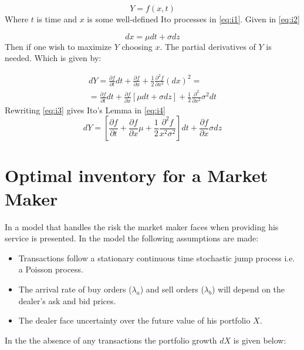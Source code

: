 \documentclass{kththesis}
\theoremstyle{definition}
\begin{document}
\begin{equation}
    Y = f(x,t)
    \label{eq:i1}
\end{equation}
Where $t$ is time and $x$ is some well-defined Ito processes \parencite{o1995market} in \autoref{eq:i1}. Given in \autoref{eq:i2}

\begin{equation}
    dx = \mu dt + \sigma dz
    \label{eq:i2}
\end{equation}
Then if one wish to maximize $Y$ choosing $x$. The partial derivatives of $Y$ is needed. Which is given by:

\begin{align}
    dY = \frac{\partial f}{\partial t}dt + \frac{\partial f}{\partial x} + \frac{1}{2}\frac{\partial^{2} f}{\partial x^{2}}(dx)^{2} = \\
    = \frac{\partial f}{\partial t}dt + \frac{\partial f}{\partial x}[\mu dt + \sigma dz] + \frac{1}{2} \frac{\partial^{2}}{\partial x^{2}} \sigma^{2} dt
    \label{eq:i3}
\end{align}
Rewriting \autoref{eq:i3} gives Ito's Lemma in \autoref{eq:i4}
\begin{equation}
    dY = \left[\frac{\partial f}{\partial t} + \frac{\partial f}{\partial x}\mu + \frac{1}{2}\frac{\partial^{2} f}{x^{2} \sigma^{2}} \right]dt + \frac{\partial f}{\partial x}\sigma dz
    \label{eq:i4}
\end{equation}

\section{Optimal inventory for a Market Maker}
In \textcite{ho1981optimal} a model that handles the risk the market maker faces when providing his service is presented. In the model the following assumptions are made:

\begin{itemize}
    \item Transactions follow a stationary continuous time stochastic jump process i.e. a Poisson process. 
    
    \item The arrival rate of buy orders ($\lambda_a$) and sell orders ($\lambda_b$) will depend on the dealer's ask and bid prices.
    
    \item The dealer face uncertainty over the future value of his portfolio $X$.
\end{itemize}
In the the absence of any transactions the portfolio growth $dX$ is given below:
\end{document}
